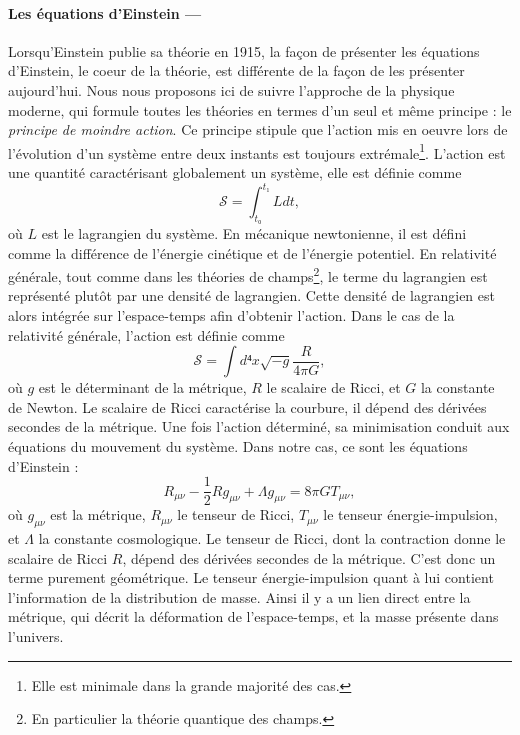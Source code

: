\documentclass[11pt, twoside, a4paper, openright]{report}
\begin{document}
\paragraph{Les équations d'Einstein —}
Lorsqu'Einstein publie sa théorie en 1915, la façon de présenter les équations d'Einstein, le coeur de la théorie, est différente de la façon de les présenter aujourd'hui. Nous nous proposons ici de suivre l'approche de la physique moderne, qui formule toutes les théories en termes d'un seul et même principe : le \emph{principe de moindre action}. Ce principe stipule que l'action mis en oeuvre lors de l'évolution d'un système entre deux instants est toujours extrémale\footnote{Elle est minimale dans la grande majorité des cas.}. L'action est une quantité caractérisant globalement un système, elle est définie comme
\begin{equation}
  \label{eq:action}
  \mathcal{S} = \int_{t₀}^{t₁} L dt,
\end{equation}
où $L$ est le lagrangien du système. En mécanique newtonienne, il est défini comme la différence de l'énergie cinétique et de l'énergie potentiel. En relativité générale, tout comme dans les théories de champs\footnote{En particulier la théorie quantique des champs.}, le terme du lagrangien est représenté plutôt par une densité de lagrangien. Cette densité de lagrangien est alors intégrée sur l'espace-temps afin d'obtenir l'action. Dans le cas de la relativité générale, l'action est définie comme
\begin{equation}
  \label{eq:actionrg}
  \mathcal{S} = \int d⁴x \sqrt{-g} \frac{R}{4 \pi G} ,
\end{equation}
où $g$ est le déterminant de la métrique, $R$ le scalaire de Ricci, et $G$ la constante de Newton. Le scalaire de Ricci caractérise la courbure, il dépend des dérivées secondes de la métrique. Une fois l'action déterminé, sa minimisation conduit aux équations du mouvement du système. Dans notre cas, ce sont les équations d'Einstein :
\begin{equation}
  \label{eq:einstein}
  R_{\mu \nu} - \frac{1}{2} R g_{\mu \nu} + \Lambda g_{\mu \nu} = 8 \pi G T_{\mu \nu},
\end{equation}
où $g_{\mu \nu}$ est la métrique, $R_{\mu \nu}$ le tenseur de Ricci, $T_{\mu \nu}$ le tenseur énergie-impulsion, et $\Lambda$ la constante cosmologique. Le tenseur de Ricci, dont la contraction donne le scalaire de Ricci $R$, dépend des dérivées secondes de la métrique. C'est donc un terme purement géométrique. Le tenseur énergie-impulsion quant à lui contient l'information de la distribution de masse. Ainsi il y a un lien direct entre la métrique, qui décrit la déformation de l'espace-temps, et la masse présente dans l'univers.
\end{document}
